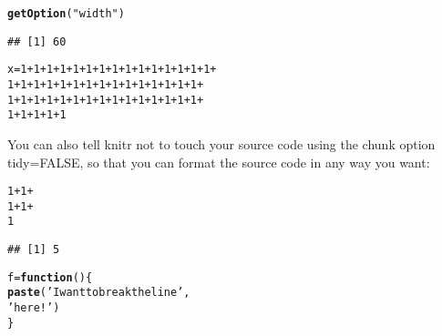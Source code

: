 \documentclass{article}\usepackage[]{graphicx}\usepackage[]{color}
\makeatletter
\newcommand{\hlnum}[1]{\textcolor[rgb]{0.686,0.059,0.569}{#1}}%
\newcommand{\hlstr}[1]{\textcolor[rgb]{0.192,0.494,0.8}{#1}}%
\newcommand{\hlopt}[1]{\textcolor[rgb]{0,0,0}{#1}}%
\newcommand{\hlstd}[1]{\textcolor[rgb]{0.345,0.345,0.345}{#1}}%
\newcommand{\hlkwa}[1]{\textcolor[rgb]{0.161,0.373,0.58}{\textbf{#1}}}%
\newcommand{\hlkwb}[1]{\textcolor[rgb]{0.69,0.353,0.396}{#1}}%
\newcommand{\hlkwd}[1]{\textcolor[rgb]{0.737,0.353,0.396}{\textbf{#1}}}%
\newenvironment{kframe}{%
 \def\at@end@of@kframe{}%
 \ifinner\ifhmode%
  \def\at@end@of@kframe{\end{minipage}}%
  \begin{minipage}{\columnwidth}%
 \fi\fi%
 \def\FrameCommand##1{\hskip\@totalleftmargin \hskip-\fboxsep
 \colorbox{shadecolor}{##1}\hskip-\fboxsep
     \hskip-\linewidth \hskip-\@totalleftmargin \hskip\columnwidth}%
 \MakeFramed {\advance\hsize-\width
   \@totalleftmargin\z@ \linewidth\hsize
   \@setminipage}}%
 {\par\unskip\endMakeFramed%
 \at@end@of@kframe}
\newenvironment{knitrout}{}{} %
\makeatother
\begin{document}
\begin{knitrout}
\color{fgcolor}\begin{kframe}
\begin{alltt}
\hlkwd{getOption}\hlstd{(}\hlstr{"width"}\hlstd{)}
\end{alltt}
\begin{verbatim}
## [1] 60
\end{verbatim}
\begin{alltt}
\hlstd{x} \hlkwb{=} \hlnum{1} \hlopt{+} \hlnum{1} \hlopt{+} \hlnum{1} \hlopt{+} \hlnum{1} \hlopt{+} \hlnum{1} \hlopt{+} \hlnum{1} \hlopt{+} \hlnum{1} \hlopt{+} \hlnum{1} \hlopt{+} \hlnum{1} \hlopt{+} \hlnum{1} \hlopt{+} \hlnum{1} \hlopt{+} \hlnum{1} \hlopt{+} \hlnum{1} \hlopt{+} \hlnum{1} \hlopt{+} \hlnum{1} \hlopt{+}
    \hlnum{1} \hlopt{+} \hlnum{1} \hlopt{+} \hlnum{1} \hlopt{+} \hlnum{1} \hlopt{+} \hlnum{1} \hlopt{+} \hlnum{1} \hlopt{+} \hlnum{1} \hlopt{+} \hlnum{1} \hlopt{+} \hlnum{1} \hlopt{+} \hlnum{1} \hlopt{+} \hlnum{1} \hlopt{+} \hlnum{1} \hlopt{+} \hlnum{1} \hlopt{+} \hlnum{1} \hlopt{+} \hlnum{1} \hlopt{+}
    \hlnum{1} \hlopt{+} \hlnum{1} \hlopt{+} \hlnum{1} \hlopt{+} \hlnum{1} \hlopt{+} \hlnum{1} \hlopt{+} \hlnum{1} \hlopt{+} \hlnum{1} \hlopt{+} \hlnum{1} \hlopt{+} \hlnum{1} \hlopt{+} \hlnum{1} \hlopt{+} \hlnum{1} \hlopt{+} \hlnum{1} \hlopt{+} \hlnum{1} \hlopt{+} \hlnum{1} \hlopt{+} \hlnum{1} \hlopt{+}
    \hlnum{1} \hlopt{+} \hlnum{1} \hlopt{+} \hlnum{1} \hlopt{+} \hlnum{1} \hlopt{+} \hlnum{1}
\end{alltt}
\end{kframe}
\end{knitrout}


You can also tell knitr not to touch your source code using the chunk option tidy=FALSE, so that you can format the source code in any way you want:

\begin{knitrout}
\color{fgcolor}\begin{kframe}
\begin{alltt}
\hlnum{1} \hlopt{+} \hlnum{1} \hlopt{+}
  \hlnum{1}\hlopt{+}\hlnum{1}\hlopt{+}
  \hlnum{1}
\end{alltt}
\begin{verbatim}
## [1] 5
\end{verbatim}
\begin{alltt}
\hlstd{f} \hlkwb{=} \hlkwa{function}\hlstd{() \{}
  \hlkwd{paste}\hlstd{(}\hlstr{'I want to break the line'}\hlstd{,}
        \hlstr{'here!'}\hlstd{)}
\hlstd{\}}
\end{alltt}
\end{kframe}
\end{knitrout}
\end{document}
